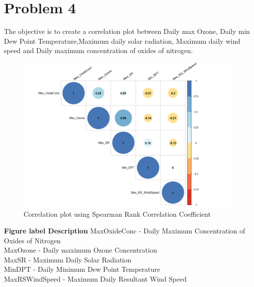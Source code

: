 \documentclass{article}%
\begin{document}
\pagebreak

\section *{Problem 4}
The objective is to create a correlation plot between Daily max Ozone, Daily min Dew Point Temperature,Maximum daily solar radiation, Maximum daily wind speed and Daily maximum concentration of oxides of nitrogen.

\begin{figure} [H]
	\begin{center}
	\includegraphics[width=1.1\textwidth]{Q3}
	\caption{\footnotesize Correlation plot using Spearman Rank Correlation Coefficient}
	\end{center}
\end{figure}

\begin{flushleft}
\textbf{Figure label Description} \linebreak
Max\textunderscore OxideConc - Daily Maximum Concentration of Oxides of Nitrogen \\
Max\textunderscore Ozone - Daily maximum Ozone Concentration \\
Max\textunderscore SR - Maximum Daily Solar Radiation \\
Min\textunderscore DPT - Daily Minimum Dew Point Temperature\\
Max\textunderscore RS\textunderscore WindSpeed - Maximum Daily Resultant Wind Speed\\ \pagebreak
\end{flushleft}
\end{document}
